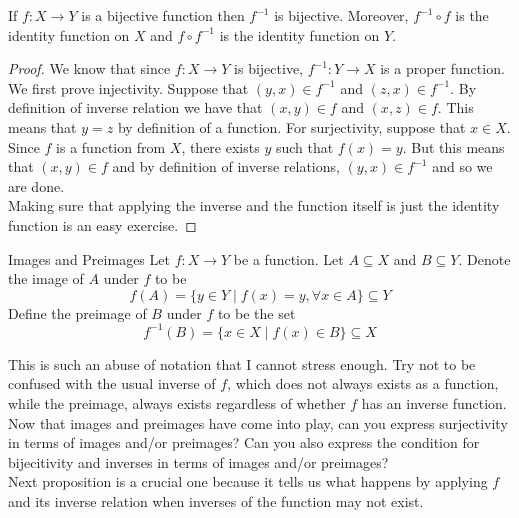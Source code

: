 \documentclass[a4paper]{article}
\begin{document}
\begin{prp}{}{} If $f:X\to Y$ is a bijective function then $f^{-1}$ is bijective. Moreover, $f^{-1}\circ f$ is the identity function on $X$ and $f\circ f^{-1}$ is the identity function on $Y$. 
\begin{proof}
We know that since $f:X\to Y$ is bijective, $f^{-1}:Y\to X$ is a proper function. We first prove injectivity. Suppose that $(y,x)\in f^{-1}$ and $(z,x)\in f^{-1}$. By definition of inverse relation we have that $(x,y)\in f$ and $(x,z)\in f$. This means that $y=z$ by definition of a function. For surjectivity, suppose that $x\in X$. Since $f$ is a function from $X$, there exists $y$ such that $f(x)=y$. But this means that $(x,y)\in f$ and by definition of inverse relations, $(y,x)\in f^{-1}$ and so we are done. \\
Making sure that applying the inverse and the function itself is just the identity function is an easy exercise. 
\end{proof}
\end{prp}

\begin{defn}{Images and Preimages}{} Let $f:X\to Y$ be a function. Let $A\subseteq X$ and $B\subseteq Y$. Denote the image of $A$ under $f$ to be $$f(A)=\{y\in Y\;|\;f(x)=y,\forall x\in A\}\subseteq Y$$
Define the preimage of $B$ under $f$ to be the set $$f^{-1}(B)=\{x\in X\;|\;f(x)\in B\}\subseteq X$$
\end{defn}

This is such an abuse of notation that I cannot stress enough. Try not to be confused with the usual inverse of $f$, which does not always exists as a function, while the preimage, always exists regardless of whether $f$ has an inverse function. \\

Now that images and preimages have come into play, can you express surjectivity in terms of images and/or preimages? Can you also express the condition for bijecitivity and inverses in terms of images and/or preimages? \\

Next proposition is a crucial one because it tells us what happens by applying $f$ and its inverse relation when inverses of the function may not exist. 
\end{document}
